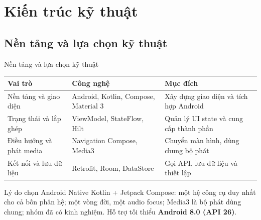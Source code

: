 \section{Kiến trúc kỹ thuật}

\subsection{Nền tảng và lựa chọn kỹ thuật}
\begin{frame}{Nền tảng và lựa chọn kỹ thuật}
\small
\centering
\begin{tabular}{@{}p{3.4cm}p{5.3cm}p{5.2cm}@{}}
\toprule
\textbf{Vai trò} & \textbf{Công nghệ} & \textbf{Mục đích} \\
\midrule
Nền tảng và giao diện & Android, Kotlin, Compose, Material 3 & Xây dựng giao diện và tích hợp Android \\
Trạng thái và lắp ghép & ViewModel, StateFlow, Hilt & Quản lý UI state và cung cấp thành phần \\
Điều hướng và phát media & Navigation Compose, Media3 & Chuyển màn hình, dùng chung bộ phát \\
Kết nối và lưu dữ liệu & Retrofit, Room, DataStore & Gọi API, lưu dữ liệu và thiết lập \\
\bottomrule
\end{tabular}

\vspace{0.3cm}
\begin{exampleblock}{Lý do chọn Android Native}
Kotlin + Jetpack Compose: một hệ công cụ duy nhất cho cả bốn phân hệ; một vòng đời, một audio focus; Media3 là bộ phát dùng chung; nhóm đã có kinh nghiệm. Hỗ trợ tối thiểu \textbf{Android 8.0 (API 26)}.
\end{exampleblock}
\end{frame}

